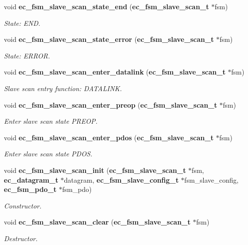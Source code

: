 \begin{DoxyCompactItemize}
void {\bf ec\-\_\-fsm\-\_\-slave\-\_\-scan\-\_\-state\-\_\-end} ({\bf ec\-\_\-fsm\-\_\-slave\-\_\-scan\-\_\-t} $\ast$fsm)
\begin{DoxyCompactList}\small\item\em \-State\-: \-E\-N\-D. \end{DoxyCompactList}\item 
void {\bf ec\-\_\-fsm\-\_\-slave\-\_\-scan\-\_\-state\-\_\-error} ({\bf ec\-\_\-fsm\-\_\-slave\-\_\-scan\-\_\-t} $\ast$fsm)
\begin{DoxyCompactList}\small\item\em \-State\-: \-E\-R\-R\-O\-R. \end{DoxyCompactList}\item 
void {\bf ec\-\_\-fsm\-\_\-slave\-\_\-scan\-\_\-enter\-\_\-datalink} ({\bf ec\-\_\-fsm\-\_\-slave\-\_\-scan\-\_\-t} $\ast$fsm)
\begin{DoxyCompactList}\small\item\em \-Slave scan entry function\-: \-D\-A\-T\-A\-L\-I\-N\-K. \end{DoxyCompactList}\item 
void {\bf ec\-\_\-fsm\-\_\-slave\-\_\-scan\-\_\-enter\-\_\-preop} ({\bf ec\-\_\-fsm\-\_\-slave\-\_\-scan\-\_\-t} $\ast$fsm)
\begin{DoxyCompactList}\small\item\em \-Enter slave scan state \-P\-R\-E\-O\-P. \end{DoxyCompactList}\item 
void {\bf ec\-\_\-fsm\-\_\-slave\-\_\-scan\-\_\-enter\-\_\-pdos} ({\bf ec\-\_\-fsm\-\_\-slave\-\_\-scan\-\_\-t} $\ast$fsm)
\begin{DoxyCompactList}\small\item\em \-Enter slave scan state \-P\-D\-O\-S. \end{DoxyCompactList}\item 
void {\bf ec\-\_\-fsm\-\_\-slave\-\_\-scan\-\_\-init} ({\bf ec\-\_\-fsm\-\_\-slave\-\_\-scan\-\_\-t} $\ast$fsm, {\bf ec\-\_\-datagram\-\_\-t} $\ast$datagram, {\bf ec\-\_\-fsm\-\_\-slave\-\_\-config\-\_\-t} $\ast$fsm\-\_\-slave\-\_\-config, {\bf ec\-\_\-fsm\-\_\-pdo\-\_\-t} $\ast$fsm\-\_\-pdo)
\begin{DoxyCompactList}\small\item\em \-Constructor. \end{DoxyCompactList}\item 
void {\bf ec\-\_\-fsm\-\_\-slave\-\_\-scan\-\_\-clear} ({\bf ec\-\_\-fsm\-\_\-slave\-\_\-scan\-\_\-t} $\ast$fsm)
\begin{DoxyCompactList}\small\item\em \-Destructor. \end{DoxyCompactList}\item 

\end{DoxyCompactItemize}
